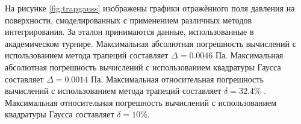 На рисунке \ref{fig:trapgauss} изображены графики отражённого поля давления на поверхности, смоделированных с применением различных методов интегрирования. За эталон принимаются данные, использованные в академическом турнире.  Максимальная абсолютная погрешность вычислений с  использованием метода трапеций составляет $\Delta = 0.0046$ Па.
Максимальная абсолютная погрешность вычислений с  использованием квадратуры  Гаусса составляет $\Delta = 0.0014$ Па.
Максимальная относительная погрешность вычислений с  использованием метода трапеций составляет $\delta = 32.4\%$ .
Максимальная относительная погрешность вычислений с  использованием квадратуры  Гаусса составляет $\delta = 10\%$.

